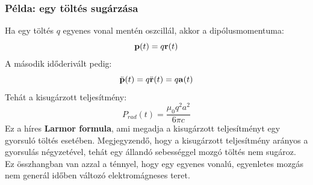 \documentclass[../main.tex]{subfiles}
\begin{document}
\subsubsection*{Példa: egy töltés sugárzása}
Ha egy töltés $q$ egyenes vonal mentén oszcillál, akkor a dipólusmomentuma:
\begin{equation}
    \bold{p}(t) = q \bold{r}(t)
\end{equation}
A második időderivált pedig:
\begin{equation}
    \ddot{\bold{p}}(t) = q \ddot{\bold{r}}(t) = q \bold{a}(t)
\end{equation}
Tehát a kisugárzott teljesítmény:
\begin{equation}
    P_{rad}(t) = \frac{\mu_0 q^2 a^2}{6 \pi c}
\end{equation}
Ez a híres \textbf{Larmor formula}, ami megadja a kisugárzott teljesítményt egy gyorsuló töltés esetében. Megjegyzendő, hogy a kisugárzott teljesítmény arányos a gyorsulás négyzetével, tehát egy állandó sebességgel mozgó töltés nem sugároz.
Ez összhangban van azzal a ténnyel, hogy egy egyenes vonalú, egyenletes mozgás nem generál időben változó elektromágneses teret.
\end{document}
